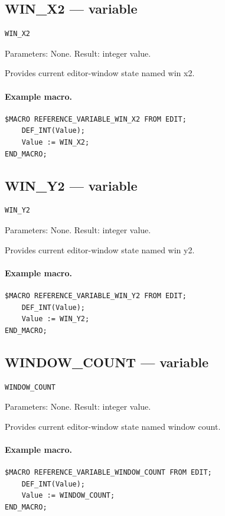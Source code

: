 \documentclass[a4paper,10pt,twoside,openany]{book}
\begin{document}
\subsection*{WIN\_X2 --- variable}
\begin{verbatim}
WIN_X2
\end{verbatim}
Parameters: None. Result: integer value.

Provides current editor-window state named win x2.

\paragraph{Example macro.}
\begin{verbatim}
$MACRO REFERENCE_VARIABLE_WIN_X2 FROM EDIT;
    DEF_INT(Value);
    Value := WIN_X2;
END_MACRO;
\end{verbatim}

\label{prim:variable-win-y2}
\subsection*{WIN\_Y2 --- variable}
\begin{verbatim}
WIN_Y2
\end{verbatim}
Parameters: None. Result: integer value.

Provides current editor-window state named win y2.

\paragraph{Example macro.}
\begin{verbatim}
$MACRO REFERENCE_VARIABLE_WIN_Y2 FROM EDIT;
    DEF_INT(Value);
    Value := WIN_Y2;
END_MACRO;
\end{verbatim}

\label{prim:variable-window-count}
\subsection*{WINDOW\_COUNT --- variable}
\begin{verbatim}
WINDOW_COUNT
\end{verbatim}
Parameters: None. Result: integer value.

Provides current editor-window state named window count.

\paragraph{Example macro.}
\begin{verbatim}
$MACRO REFERENCE_VARIABLE_WINDOW_COUNT FROM EDIT;
    DEF_INT(Value);
    Value := WINDOW_COUNT;
END_MACRO;
\end{verbatim}
\end{document}
